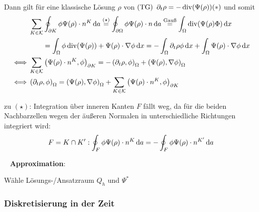 Dann gilt für eine klassische Lösung $ \rho $ von $ \operatorname{(TG)} $  $ \partial_t \rho = - \operatorname{div}(\Psi(\rho)) (*) $ und somit
\begin{align*}
	&\sum_{K \in \mathcal{K}} \oint_{\partial K} \phi \Psi(\rho) \cdot n^K \mathop{}\!\mathrm{d} a \stackrel{(\star)}{=} \oint_{\partial \Omega} \phi \Psi(\rho) \cdot n \mathop{}\!\mathrm{d} a \stackrel{\text{Gauß}}{=} \int_{\Omega} \operatorname{div}(\Psi(\rho) \Phi) \mathop{}\!\mathrm{d} x \\
	& \qquad = \int_{\Omega} \phi \operatorname{div}(\Psi(\rho)) + \Psi(\rho) \cdot \nabla \phi \mathop{}\!\mathrm{d} x = - \int_\Omega \partial_t \rho \phi \mathop{}\!\mathrm{d} x + \int_\Omega \Psi(\rho) \cdot \nabla \phi \mathop{}\!\mathrm{d} x \\
	\iff &\sum_{K \in \mathcal{K}} \left(\Psi(\rho) \cdot n^K, \phi \right)_{\partial K} = - \left(\partial_t \rho, \phi  \right)_\Omega + \left(\Psi(\rho), \nabla\phi  \right)_\Omega \\
	\iff & \left(\partial_t \rho, \phi  \right)_\Omega  = \left(\Psi(\rho), \nabla\phi  \right)_\Omega + \sum_{K \in \mathcal{K}} \left(\Psi(\rho) \cdot n^K, \phi \right)_{\partial K} 
\end{align*}
\begin{remark}
	zu $ (\star) $: Integration über inneren Kanten $ F $ fällt weg, da für die beiden Nachbarzellen wegen der äußeren Normalen in unterschiedliche Richtungen integriert wird:
	\[ F = K \cap K': \oint_{F}  \phi \Psi(\rho) \cdot n^K \mathop{}\!\mathrm{d} a = - \oint_{F} \phi \Psi(\rho) \cdot n^{K'} \mathop{}\!\mathrm{d} a\]
\end{remark}
\ \newline
\textbf{Approximation}:

Wähle Lösungs-/Ansatzraum $ Q_h $ und  $ \Psi^* $
 
  

\subsubsection{Diskretisierung in der Zeit}

 